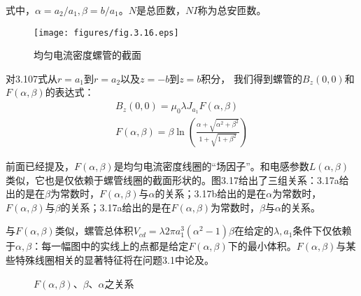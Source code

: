式中，$\alpha=a_2/a_1,\beta=b/a_1$。$N$是总匝数，$NI$称为总安匝数。
\begin{figure}[htbp]
  \centering
 \texttt{[image: figures/fig.3.16.eps]}
  \caption{均匀电流密度螺管的截面}
\end{figure}

对3.107式从$r=a_1$到$r=a_2$以及$z=-b$到$z=b$积分，
我们得到螺管的$B_z(0,0)$和$F(\alpha,\beta)$的表达式：
\begin{eqnarray}
B_z(0,0)=\mu_0\lambda J_{a_1}F(\alpha,\beta)\\ %
F(\alpha,\beta)=\beta \ln\left(\frac{\alpha+\sqrt{\alpha^2+\beta^2}}{1+\sqrt{1+\beta^2}}\right)
\end{eqnarray}

前面已经提及，$F(\alpha,\beta)$是均匀电流密度线圈的“场因子”。和电感参数$L(\alpha,\beta)$类似，它也是仅依赖于螺管线圈的截面形状的。图3.17给出了三组关系：3.17a给出的是在$\beta$为常数时，$F(\alpha,\beta)$与$\alpha$的关系；3.17b给出的是在$\alpha$为常数时，$F(\alpha,\beta)$与$\beta$的关系；3.17a给出的是在$F(\alpha,\beta)$为常数时，$\beta$与$\alpha$的关系。

与$F(\alpha,\beta)$类似，螺管总体积$V_{cd}=\lambda 2\pi a_1^3(\alpha^2-1)\beta$在给定的$\lambda,a_1$条件下仅依赖于$\alpha,\beta$：每一幅图中的实线上的点都是给定$F(\alpha,\beta)$下的最小体积。$F(\alpha,\beta)$与某些特殊线圈相关的显著特征将在问题3.1中论及。

\begin{figure}
	\centering

	
	\caption{$F(\alpha,\beta)$、$\beta$、$\alpha$之关系}
	\label{fig:subfig} %
\end{figure}

